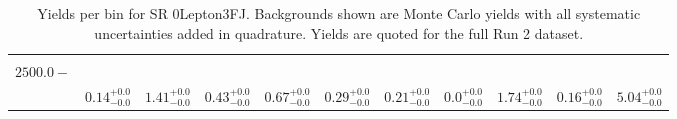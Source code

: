\begin{table}[!htbp]
\begin{tabular}{c|c|c|c|c|c|c|c|c|c||c}
    \hline
    \pbox{20cm}{ ~ \\$2500.0-$\\ } & $0.14  ^{+0.0}_{-0.0}$ & $1.41  ^{+0.0}_{-0.0}$ & $0.43  ^{+0.0}_{-0.0}$ & $0.67  ^{+0.0}_{-0.0}$ & $0.29  ^{+0.0}_{-0.0}$ & $0.21  ^{+0.0}_{-0.0}$ & $0.0  ^{+0.0}_{-0.0}$ & $1.74  ^{+0.0}_{-0.0}$ & $0.16  ^{+0.0}_{-0.0}$ & $5.04  ^{+0.0}_{-0.0}$\\
\end{tabular}
    \caption{Yields per bin for SR 0Lepton3FJ. Backgrounds shown are Monte Carlo yields with all systematic uncertainties added in quadrature. Yields are quoted for the full Run 2 dataset.}
    \label{tab:0Lepton3FJ$binssyst}
\end{table}
